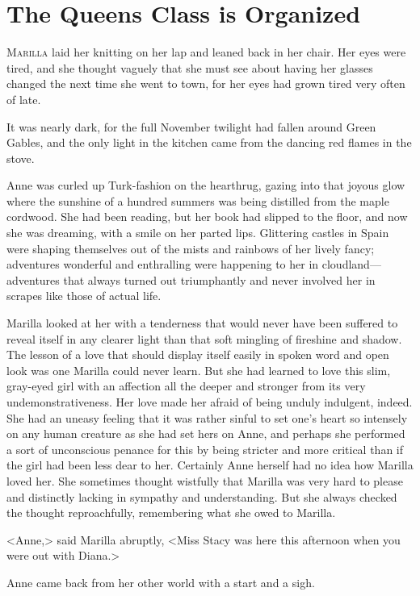 \chapter{The Queens Class is Organized}

\lettrine[]{M}{arilla} laid her knitting on her lap and leaned back in her chair. Her eyes were tired, and she thought vaguely that she must see about having her glasses changed the next time she went to town, for her eyes had grown tired very often of late.

It was nearly dark, for the full November twilight had fallen around Green Gables, and the only light in the kitchen came from the dancing red flames in the stove.

Anne was curled up Turk-fashion on the hearthrug, gazing into that joyous glow where the sunshine of a hundred summers was being distilled from the maple cordwood. She had been reading, but her book had slipped to the floor, and now she was dreaming, with a smile on her parted lips. Glittering castles in Spain were shaping themselves out of the mists and rainbows of her lively fancy; adventures wonderful and enthralling were happening to her in cloudland—adventures that always turned out triumphantly and never involved her in scrapes like those of actual life.

Marilla looked at her with a tenderness that would never have been suffered to reveal itself in any clearer light than that soft mingling of fireshine and shadow. The lesson of a love that should display itself easily in spoken word and open look was one Marilla could never learn. But she had learned to love this slim, gray-eyed girl with an affection all the deeper and stronger from its very undemonstrativeness. Her love made her afraid of being unduly indulgent, indeed. She had an uneasy feeling that it was rather sinful to set one's heart so intensely on any human creature as she had set hers on Anne, and perhaps she performed a sort of unconscious penance for this by being stricter and more critical than if the girl had been less dear to her. Certainly Anne herself had no idea how Marilla loved her. She sometimes thought wistfully that Marilla was very hard to please and distinctly lacking in sympathy and understanding. But she always checked the thought reproachfully, remembering what she owed to Marilla.

<Anne,> said Marilla abruptly, <Miss Stacy was here this afternoon when you were out with Diana.>

Anne came back from her other world with a start and a sigh.

